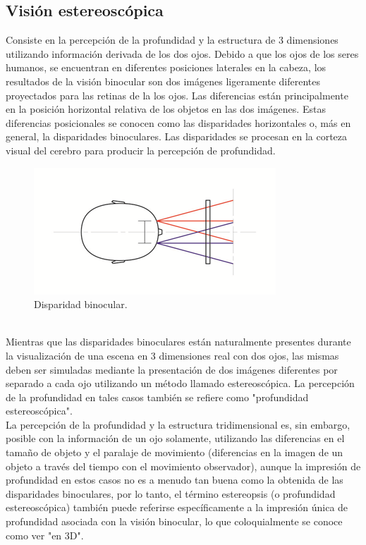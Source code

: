 \documentclass[12pt]{article}
\begin{document}
\subsection{Visión estereoscópica}
Consiste en la percepción de la profundidad y la estructura de 3 dimensiones utilizando información derivada de los dos ojos. Debido a que los ojos de los seres humanos, se encuentran en diferentes posiciones laterales en la cabeza, los resultados de la visión binocular son dos imágenes ligeramente diferentes proyectados para las retinas de la los ojos. Las diferencias están principalmente en la posición horizontal relativa de los objetos en las dos imágenes. Estas diferencias posicionales se conocen como las disparidades horizontales o, más en general, la disparidades binoculares. Las disparidades se procesan en la corteza visual del cerebro para producir la percepción de profundidad. 
\begin{figure}[h!]
\includegraphics[width =0.7\linewidth, center]{ojos.png}
\caption{Disparidad binocular.}
\label{ fig : surface }
\end{figure}
\\Mientras que las disparidades binoculares están naturalmente presentes durante la visualización de una escena en 3 dimensiones real con dos ojos, las mismas deben ser simuladas mediante la presentación de dos imágenes diferentes por separado a cada ojo utilizando un método llamado estereoscópica. La percepción de la profundidad en tales casos también se refiere como "profundidad estereoscópica". 
\\La percepción de la profundidad y la estructura tridimensional  es, sin embargo, posible con la información de un ojo solamente, utilizando las diferencias en el tamaño de objeto y el paralaje de movimiento (diferencias en la imagen de un objeto a través del tiempo con el movimiento observador), aunque la impresión de profundidad en estos casos no es a menudo tan buena como la obtenida de las disparidades binoculares, por lo tanto, el término estereopsis (o profundidad estereoscópica) también puede referirse específicamente a la impresión única de profundidad asociada con la visión binocular, lo que coloquialmente se conoce como ver "en 3D".
\end{document}
